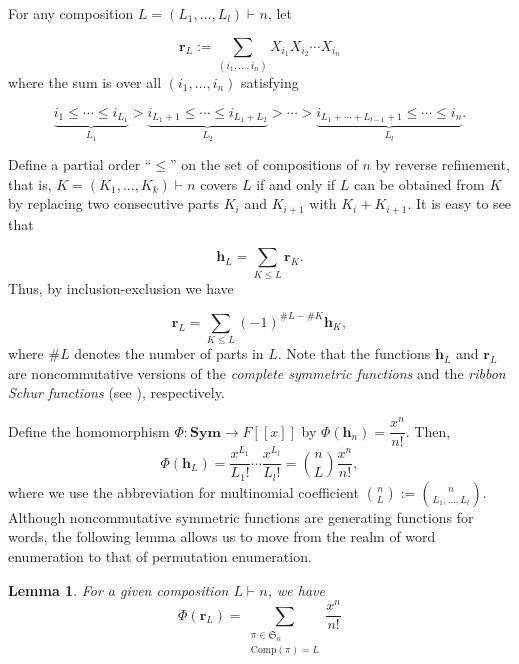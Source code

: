 \documentclass[11pt,reqno]{amsart}
\numberwithin{equation}{section}
\theoremstyle{plain}
\newtheorem{lemma}[theorem]{Lemma}
\theoremstyle{definition}
\renewcommand{\S}{\mathfrak{S}}
\begin{document}
For any composition $L=\left(L_1, \ldots, L_l\right) \vdash n$, let

$$
\mathbf{r}_L:=\sum_{\left(i_1, \ldots, i_n\right)} X_{i_1} X_{i_2} \cdots X_{i_n}
$$where the sum is over all $\left(i_1, \ldots, i_n\right)$ satisfying

$$
\underbrace{i_1 \leq \cdots \leq i_{L_1}}_{L_1}>\underbrace{i_{L_1+1} \leq \cdots \leq i_{L_1+L_2}}_{L_2}>\cdots>\underbrace{i_{L_1+\cdots+L_{l-1}+1} \leq \cdots \leq i_n}_{L_l} .
$$

Define a partial order ``$\leq$'' on the set of compositions of $n$ by reverse refinement, that is, $K=\left(K_1, \ldots, K_k\right) \vdash n$ covers $L$ if and only if $L$ can be obtained from $K$ by replacing two consecutive parts $K_i$ and $K_{i+1}$ with $K_i+K_{i+1}$. It is easy to see that 


$$
\mathbf{h}_L=\sum_{K \leq L} \mathbf{r}_K.
$$Thus, by inclusion-exclusion we have

$$
\mathbf{r}_L=\sum_{K \leq L}(-1)^{\#L-\#K} \mathbf{h}_K,
$$where $\#L$ denotes the number of parts in $L$. Note that the functions $\mathbf{h}_L$ and $\mathbf{r}_L$ are noncommutative versions of the \emph{complete symmetric functions} and the \emph{ribbon Schur functions} (see \cite[Chap.~7]{sta11}), respectively.

Define the homomorphism $\Phi: \mathbf{S y m} \rightarrow F[[x]]$ by $\Phi\left(\mathbf{h}_n\right)=\dfrac{x^n}{n!}$. Then, $$\Phi(\mathbf{h}_{L})=\frac{x^{L_1}}{L_1 !}\cdots \frac{x^{L_l}}{L_l !}=\binom{n}{L}\frac{x^n}{n!},$$
where we use the abbreviation for multinomial coefficient $\binom{n}{L}:=\binom{n}{L_1,\ldots,L_l}$. Although noncommutative symmetric functions are generating functions for words, the following lemma allows us to move from the realm of word enumeration to that of permutation enumeration.

\begin{lemma}{\cite{zhu17}}
For a given composition $L\vdash n$, we have  
\begin{equation}\label{homomorphsim}
\Phi (\mathbf{r}_L)=\sum_{\substack{\pi \in \S_n\\ \mathrm{Comp}(\pi)=L}} \frac{x^n}{n!}
\end{equation}
\end{lemma}
\end{document}
